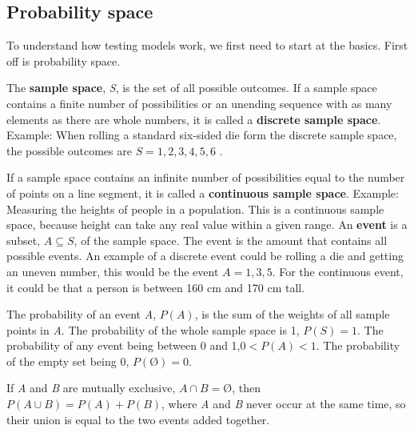 \subsection{Probability space}
To understand how testing models work, we first need to start at the basics. First off is probability space. 

The \textbf{sample space}, \textit{S}, is the set of all possible outcomes.
\newline
If a sample space contains a finite number of possibilities or an unending sequence with as many elements as there are whole numbers, it is called a \textbf{discrete sample space}.
\newline
Example: When rolling a standard six-sided die form the discrete sample space, the possible outcomes are $S={1,2,3,4,5,6}$ .
\newline

\noindent If a sample space contains an infinite number of possibilities equal to the number of points on a line segment, it is called a \textbf{continuous sample space}.
\break
Example: Measuring the heights of people in a population. This is a continuous sample space, because height can take any real value within a given range. 
\newline
An \textbf{event} is a subset, $A\subseteq S$, of the sample space. The event is the amount that contains all possible events.
An example of a discrete event could be rolling a die and getting an uneven number, this would be the event $A={1,3,5}$.
\newline 
For the continuous event, it could be that a person is between 160 cm and 170 cm tall.
\newline

\noindent The probability of an event \textit{A}, $P(A)$, is the sum of the weights of all sample points in \textit{A}.
The probability of the whole sample space is 1, $P(S)=1$.
The probability of any event being between 0 and 1,$0<P(A)<1$.
The probability of the empty set being 0, $P(Ø)=0$.
\newline
\newline

\noindent If \textit{A} and \textit{B} are mutually exclusive, $A \cap B=Ø$, then
\newline
$P(A \cup B) = P(A)+P(B)$,
\newline
\newline
where \textit{A} and \textit{B} never occur at the same time, so their union is equal to the two events added together. 
\newline

